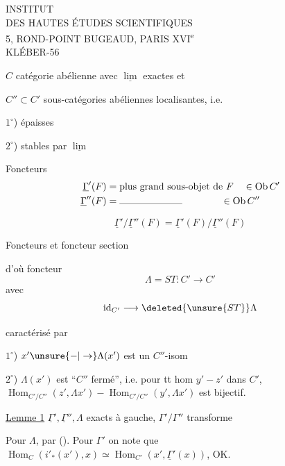 \begin{center}
INSTITUT\\
DES HAUTES ÉTUDES SCIENTIFIQUES\\
5, ROND-POINT BUGEAUD, PARIS XVI\textsuperscript{e}\\
KLÉBER-56
\end{center}

$C$ catégorie abélienne avec $\underline{\lim}$ exactes et 

$C''\subset C'$ sous-catégories abéliennes localisantes, i.e.

$1^\circ$) épaisses

$2^\circ$) stables par $\underline{\lim}$

Foncteurs
\[
\begin{aligned}
\underline{\Gamma}'(F)&=\text{plus grand sous-objet de }F\quad\in\mathrm{Ob}\,C'\\
\underline{\Gamma}''(F)&=\rule{6.5em}{.3pt}\qquad\qquad\in\mathrm{Ob}\,C''
\end{aligned}
\]


\[
\underline{\Gamma}'/\underline{\Gamma}''(F)=\underline{\Gamma}'(F)/\underline{\Gamma}''(F)
\]

Foncteurs
et foncteur section


d'où foncteur
\[
\Lambda=ST:C'\longrightarrow C'
\]
avec
\[
\mathrm{id}_{C'}\longrightarrow\deleted{\unsure{ST}}\Lambda
\]

caractérisé par

$1^\circ$) $x'\unsure{\mathord{-}|\to}\Lambda(x')$ est un $C''$-isom

$2^\circ$) $\Lambda(x')$ est ``$C''$ fermé'', i.e. pour tt hom $y'-z'$ dans $C'$, $\operatorname{Hom}_{C'/C''}(z',\Lambda x')-\operatorname{Hom}_{C'/C''}(y',\Lambda x')$ est bijectif.

\uline{Lemme 1} $\underline{\Gamma}',\underline{\Gamma}'',\Lambda$ exacts à gauche, $\Gamma'/\Gamma''$ transforme



Pour $\Lambda$, par  (). Pour $\Gamma'$ on note que  $\operatorname{Hom}_C(i'_*(x'),x)\simeq\operatorname{Hom}_{C'}(x',\underline{\Gamma}'(x))$, OK.

